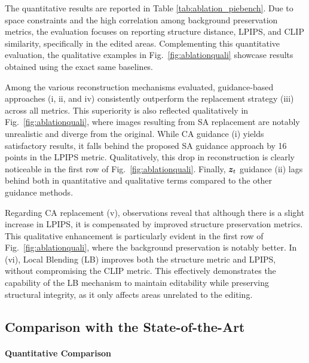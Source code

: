 The quantitative results are reported in Table \ref{tab:ablation_piebench}. Due to space constraints and the high correlation among background preservation metrics, {\modified{}the evaluation focuses} on reporting structure distance, LPIPS, and CLIP similarity, specifically in the edited areas. Complementing this quantitative evaluation, {\modified{}the qualitative examples} in Fig.~\ref{fig:ablationquali} {\modified{}showcase} results obtained using the exact same baselines.



Among the various reconstruction mechanisms evaluated, guidance-based approaches (i, ii, and iv) consistently outperform the replacement strategy (iii) across all metrics. This superiority is also reflected qualitatively in Fig.~\ref{fig:ablationquali}, where images resulting from SA replacement are notably unrealistic and diverge from the original. While CA guidance (i) yields satisfactory results, it falls behind {\modified{}the proposed SA guidance} approach by 16 points in the LPIPS metric. Qualitatively, this drop in reconstruction is clearly noticeable in the first row of Fig.~\ref{fig:ablationquali}. Finally, ${\bm{z}}_t$ guidance (ii) lags behind both in quantitative and qualitative terms compared to the other guidance methods.



{\modified{}Regarding CA replacement (v), observations reveal} that although there is a slight increase in LPIPS, it is compensated by improved structure preservation metrics. This qualitative enhancement is particularly evident in the first row of Fig.~\ref{fig:ablationquali}, where the background preservation is notably better. In (vi), Local Blending (LB) improves both the structure metric and LPIPS, without compromising the CLIP metric. This effectively demonstrates the capability of {\modified{}the LB mechanism} to maintain editability while preserving structural integrity, as it only affects areas unrelated to the editing.


\subsection{Comparison with the State-of-the-Art}



\label{sec:expsota}
\paragraph{Quantitative Comparison}

